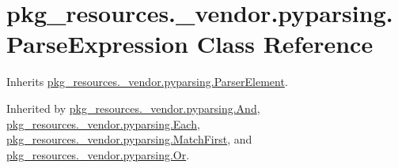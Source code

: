 \hypertarget{classpkg__resources_1_1__vendor_1_1pyparsing_1_1_parse_expression}{}\section{pkg\+\_\+resources.\+\_\+vendor.\+pyparsing.\+Parse\+Expression Class Reference}
\label{classpkg__resources_1_1__vendor_1_1pyparsing_1_1_parse_expression}


Inherits \hyperlink{classpkg__resources_1_1__vendor_1_1pyparsing_1_1_parser_element}{pkg\+\_\+resources.\+\_\+vendor.\+pyparsing.\+Parser\+Element}.



Inherited by \hyperlink{classpkg__resources_1_1__vendor_1_1pyparsing_1_1_and}{pkg\+\_\+resources.\+\_\+vendor.\+pyparsing.\+And}, \hyperlink{classpkg__resources_1_1__vendor_1_1pyparsing_1_1_each}{pkg\+\_\+resources.\+\_\+vendor.\+pyparsing.\+Each}, \hyperlink{classpkg__resources_1_1__vendor_1_1pyparsing_1_1_match_first}{pkg\+\_\+resources.\+\_\+vendor.\+pyparsing.\+Match\+First}, and \hyperlink{classpkg__resources_1_1__vendor_1_1pyparsing_1_1_or}{pkg\+\_\+resources.\+\_\+vendor.\+pyparsing.\+Or}.

